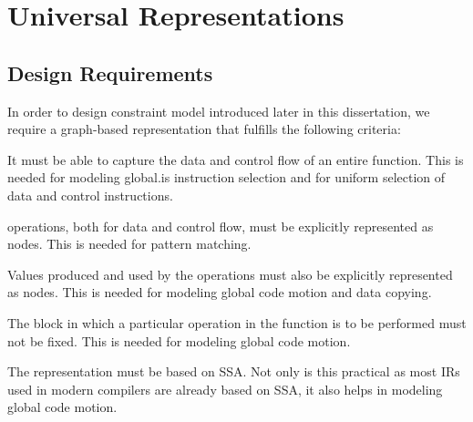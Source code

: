 %

\chapter{Universal Representations}




\section{Design Requirements}

In order to design \gls{constraint model} introduced later in this dissertation,
we require a \gls{graph}-based representation that fulfills the following
criteria:
%
\begin{requirements}
  \item {}
    It must be able to capture the data and control flow of an entire
    \gls{function}.
    This is needed for modeling \gls{global.is} \gls{instruction selection}
    and for uniform selection of data and control \glspl{instruction}.
  \item {}
    \Glspl{operation}, both for data and control flow, must be explicitly
    represented as \glspl{node}.
    This is needed for \gls{pattern matching}.
  \item {}
    Values produced and used by the \glspl{operation} must also be explicitly
    represented as \glspl{node}.
    This is needed for modeling \gls{global code motion} and \gls{data copying}.
  \item {}
    The \gls{block} in which a particular \gls{operation} in the \gls{function}
    is to be performed must not be fixed.
    This is needed for modeling \gls{global code motion}.
  \item {}
    The representation must be based on \gls{SSA}.
    Not only is this practical as most \glspl{IR} used in modern
    \glspl{compiler} are already based on \gls{SSA}, it also helps in modeling
    \gls{global code motion}.
\end{requirements}

